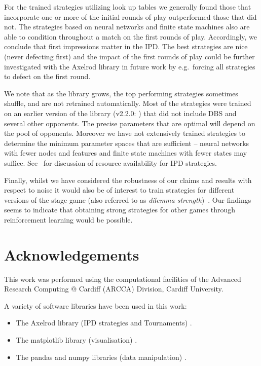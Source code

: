 \documentclass[10pt,letterpaper]{article}
\begin{document}
For the trained
strategies utilizing look up tables we generally found those that incorporate
one or more of the initial rounds of play outperformed those that did not. The
strategies based on neural networks and finite state machines also are able to
condition throughout a match on the first rounds of play. Accordingly, we conclude
that first impressions matter in the IPD\@. The best strategies are nice (never
defecting first) and the impact of the first rounds of play could be further
investigated with the Axelrod library
in future work by e.g.\ forcing all strategies to defect on the first round.

We note that as the library grows, the top performing strategies
sometimes shuffle, and are not retrained automatically. Most of the strategies were
trained on an earlier version of the library (v2.2.0: \cite{axelrodproject2.2})
that did not include DBS and several other opponents. The precise parameters
that are optimal will depend on the pool of opponents. Moreover we have not
extensively trained strategies to determine the minimum parameter spaces that are
sufficient -- neural networks with fewer nodes and features and finite state
machines with fewer states may suffice. See~\cite{ashlock2013impact} for
discussion of resource availability for IPD strategies.

Finally, whilst we have considered the robustness of our claims and results with
respect to noise it would also be of interest to train strategies for different
versions of the stage game (also referred to as \textit{dilemma
strength})~\cite{wang2015universal, tanimoto2007}. Our findings seems to indicate that obtaining
strong strategies for other games through reinforcement learning would be
possible.

\section*{Acknowledgements}

This work was performed using the computational facilities of the Advanced
Research Computing @ Cardiff (ARCCA) Division, Cardiff University.

A variety of software libraries have been used in this work:

\begin{itemize}
    \item The Axelrod library (IPD strategies and Tournaments)
        \cite{axelrodproject}.
    \item The matplotlib library (visualisation) \cite{hunter2007matplotlib}.
    \item The pandas and numpy libraries (data manipulation)
        \cite{mckinney2010data, walt2011numpy}.
\end{itemize}
\end{document}

